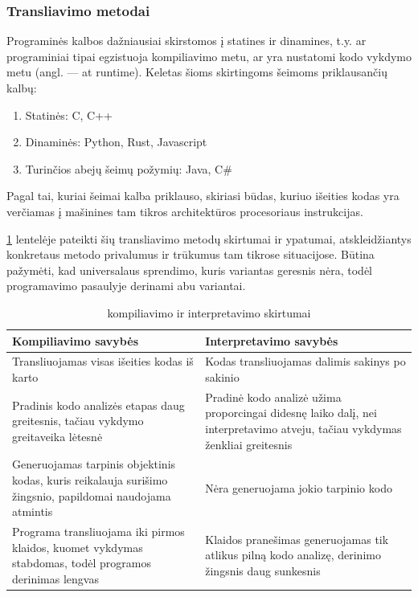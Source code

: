 \documentclass{VUMIFPSkursinis}
\begin{document}
\subsubsection{Transliavimo metodai}
Programinės kalbos dažniausiai skirstomos į statines ir dinamines, t.y. ar programiniai tipai egzistuoja kompiliavimo metu, ar yra nustatomi kodo vykdymo metu (angl. — at runtime). Keletas šioms skirtingoms šeimoms priklausančių kalbų:
\begin{enumerate}
    \item Statinės: C, C++
    \item Dinaminės: Python, Rust, Javascript
    \item Turinčios abejų šeimų požymių: Java, C\#
\end{enumerate}

Pagal tai, kuriai šeimai kalba priklauso, skiriasi būdas, kuriuo išeities kodas yra verčiamas į mašinines tam tikros architektūros procesoriaus instrukcijas.

\ref{tab:kompiliavimas_interpretavimas} lentelėje pateikti šių transliavimo metodų skirtumai ir ypatumai, atskleidžiantys konkretaus metodo privalumus ir trūkumus tam tikrose situacijose. Būtina pažymėti, kad universalaus sprendimo, kuris variantas geresnis nėra, todėl programavimo pasaulyje derinami abu variantai.

\begin{table}[H]
  \centering
  \caption{kompiliavimo ir interpretavimo skirtumai \cite{PRO19}}
  {\begin{tabular}{|m{13em}|m{13em}|} \hline
     Kompiliavimo savybės & Interpretavimo savybės \\
    \hline
    Transliuojamas visas išeities kodas iš karto & Kodas transliuojamas dalimis 
 sakinys po sakinio \\
 \hline
     Pradinis kodo analizės etapas daug greitesnis, 
     tačiau vykdymo greitaveika lėtesnė  & Pradinė kodo analizė 
     užima proporcingai didesnę laiko dalį, nei interpretavimo atveju, 
     tačiau vykdymas ženkliai greitesnis  \\
    \hline
     Generuojamas tarpinis objektinis kodas, kuris
 reikalauja surišimo žingsnio, papildomai naudojama atmintis & Nėra generuojama jokio tarpinio kodo \\
 \hline
 Programa transliuojama iki pirmos klaidos, kuomet 
 vykdymas stabdomas, todėl programos derinimas lengvas & Klaidos pranešimas 
 generuojamas tik atlikus pilną kodo analizę, derinimo žingsnis daug sunkesnis \\
 \hline
  \end{tabular}}
  \label{tab:kompiliavimas_interpretavimas}
\end{table}
\end{document}
